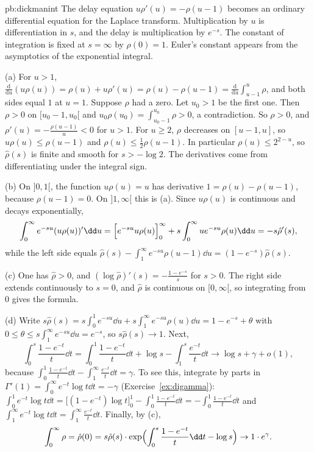 \begin{solution}{pb:dickmanint}
\idea The delay equation $u\rho'(u)=-\rho(u-1)$ becomes an ordinary differential equation for the Laplace transform. Multiplication by $u$ is differentiation in $s$, and the delay is
multiplication by $e^{-s}$. The constant of integration is fixed at $s=\infty$ by $\rho(0)=1$. Euler's constant appears from the asymptotics of the exponential integral.

\writeup (a) For $u>1$, $\frac{\mathrm d}{\mathrm du}(u\rho(u))=\rho(u)+u\rho'(u)=\rho(u)-\rho(u-1)=\frac{\mathrm d}{\mathrm du}\int_{u-1}^u\rho$, and both sides equal $1$ at $u=1$. Suppose $\rho$ had a zero.
Let $u_0>1$ be the first one. Then $\rho>0$ on $[u_0-1,u_0[$ and $u_0\rho(u_0)=\int_{u_0-1}^{u_0}\rho>0$, a contradiction. So $\rho>0$, and $\rho'(u)=-\frac{\rho(u-1)}u<0$ for $u>1$. For
$u\ge2$, $\rho$ decreases on $[u-1,u]$, so $u\rho(u)\le\rho(u-1)$ and $\rho(u)\le\frac12\rho(u-1)$. In particular $\rho(u)\le2^{2-u}$, so $\hat\rho(s)$ is finite and smooth for
$s>-\log2$. The derivatives come from differentiating under the integral sign.

(b) On $]0,1[$, the function $u\rho(u)=u$ has derivative $1=\rho(u)-\rho(u-1)$, because $\rho(u-1)=0$. On $]1,\infty[$ this is (a). Since $u\rho(u)$ is continuous and decays exponentially,
\[
\int_0^\infty e^{-su}(u\rho(u))'\dd u=\Bigl[e^{-su}u\rho(u)\Bigr]_0^\infty+s\int_0^\infty ue^{-su}\rho(u)\dd u=-s\hat\rho'(s),
\]
while the left side equals $\hat\rho(s)-\int_1^\infty e^{-su}\rho(u-1)\dd u=(1-e^{-s})\hat\rho(s)$.

(c) One has $\hat\rho>0$, and $(\log\hat\rho)'(s)=-\frac{1-e^{-s}}s$ for $s>0$. The right side extends continuously to $s=0$, and $\hat\rho$ is continuous on $[0,\infty[$, so integrating from $0$ gives the formula.

(d) Write $s\hat\rho(s)=s\int_0^1e^{-su}\dd u+s\int_1^\infty e^{-su}\rho(u)\dd u=1-e^{-s}+\theta$ with $0\le\theta\le s\int_1^\infty e^{-su}\dd u=e^{-s}$, so $s\hat\rho(s)\to1$. Next,
\[
\int_0^s\frac{1-e^{-t}}t\dd t=\int_0^1\frac{1-e^{-t}}t\dd t+\log s-\int_1^s\frac{e^{-t}}t\dd t\to\log s+\gamma+o(1),
\]
because $\int_0^1\frac{1-e^{-t}}t\dd t-\int_1^\infty\frac{e^{-t}}t\dd t=\gamma$. To see this, integrate by parts in $\Gamma'(1)=\int_0^\infty e^{-t}\log t\dd t=-\gamma$ (Exercise~\ref{ex:digamma}):
$\int_0^1e^{-t}\log t\dd t=\bigl[(1-e^{-t})\log t\bigr]_0^1-\int_0^1\frac{1-e^{-t}}t\dd t=-\int_0^1\frac{1-e^{-t}}t\dd t$ and $\int_1^\infty e^{-t}\log t\dd t=\int_1^\infty\frac{e^{-t}}t\dd t$. Finally, by (c),
\[
\int_0^\infty\rho=\hat\rho(0)=s\hat\rho(s)\cdot\exp\Bigl(\int_0^s\frac{1-e^{-t}}t\dd t-\log s\Bigr)\to1\cdot e^\gamma.
\]


\end{solution}
